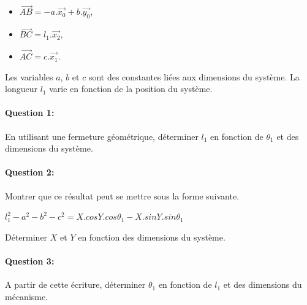 \begin{minipage}{0.45\linewidth}
\begin{itemize}
 \item $\overrightarrow{AB}=-a.\overrightarrow{x_0}+b.\overrightarrow{y_0}$,
 \item $\overrightarrow{BC}=l_1.\overrightarrow{x_2}$,
 \item $\overrightarrow{AC}=c.\overrightarrow{x_1}$. 
\end{itemize}
\end{minipage}\hfill
\begin{minipage}{0.45\linewidth}
Les variables $a$, $b$ et $c$ sont des constantes liées aux dimensions du système. La longueur $l_1$ varie en fonction de la position du système.
\end{minipage}

\paragraph{Question 1:} En utilisant une fermeture géométrique, déterminer $l_1$ en fonction de $\theta_1$ et des dimensions du système.

\paragraph{Question 2:} Montrer que ce résultat peut se mettre sous la forme suivante.

\begin{center}
$l_1^2-a^2-b^2-c^2=X.cos Y.cos\theta_1-X.sin Y.sin\theta_1$
\end{center}

Déterminer $X$ et $Y$ en fonction des dimensions du système.

\paragraph{Question 3:} A partir de cette écriture, déterminer $\theta_1$ en fonction de $l_1$ et des dimensions du mécanisme.


%

